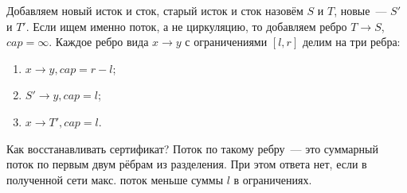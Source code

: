 Добавляем новый исток и сток, старый исток и сток назовём $S$ и $T$, новые~--- $S'$ и $T'$. Если ищем именно поток, а не циркуляцию, то добавляем ребро $T \rightarrow S$, $cap = \infty$. Каждое ребро вида $x \rightarrow y$ с ограничениями $[l, r]$ делим на три ребра:
\begin{enumerate}
\item $x \rightarrow y, cap = r - l$;
\item $S' \rightarrow y, cap = l$;
\item $x \rightarrow T', cap = l$.
\end{enumerate}

Как восстанавливать сертификат? Поток по такому ребру~--- это суммарный поток по первым двум рёбрам из разделения. При этом ответа нет, если в полученной сети макс. поток меньше суммы $l$ в ограничениях.